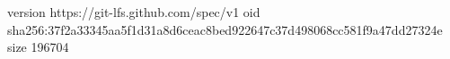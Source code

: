 version https://git-lfs.github.com/spec/v1
oid sha256:37f2a33345aa5f1d31a8d6ceac8bed922647c37d498068cc581f9a47dd27324e
size 196704
